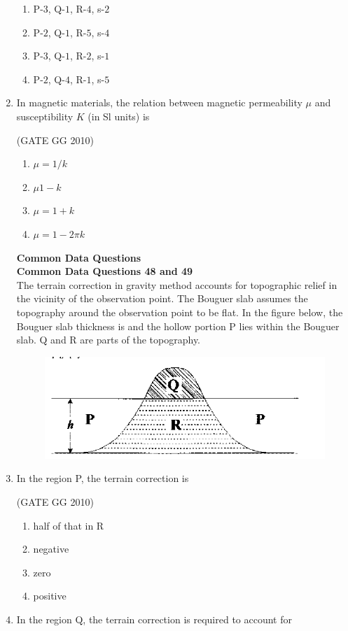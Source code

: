 \documentclass[journal]{IEEEtran}
\begin{document}
\begin{enumerate}[start=26]
\begin{enumerate}
    \item P-$3$, Q-$1$, R-$4$, s-$2$
    \item P-$2$, Q-$1$, R-$5$, s-$4$
     \item P-$3$, Q-$1$, R-$2$, s-$1$
      \item P-$2$, Q-$4$, R-$1$, s-$5$
\end{enumerate}

\item In magnetic materials, the relation between magnetic permeability $\mu$ and susceptibility $K$ (in Sl units) is

\hfill (GATE GG 2010) 

\begin{enumerate}
    \item $\mu =1/k$
    \item $\mu 1-k$
    \item $\mu=1+k$
    \item $\mu=1-2\pi k$
\end{enumerate}
\vspace{0.7cm}
\textbf{Common Data Questions}\\
\vspace{0.6cm}
\textbf{Common Data Questions 48 and 49}\\
The terrain correction in gravity method accounts for topographic relief in the vicinity of the observation point. The Bouguer slab assumes the topography around the observation point to be flat. In the figure below, the Bouguer slab thickness is and the hollow portion P lies within the Bouguer slab. Q and R are parts of the topography.

\begin{figure}[H]
    \centering
    \includegraphics[width=0.5\linewidth]{figs/04.png} 
    \caption{}
    \label{fig:4}
\end{figure}
\item In the region P, the terrain correction is

\hfill (GATE GG 2010) 

\begin{enumerate}
    \item  half of that in R
    \item negative
\item  zero
\item positive 
\end{enumerate}
\item In the region Q, the terrain correction is required to account for


\end{enumerate}
\end{document}
